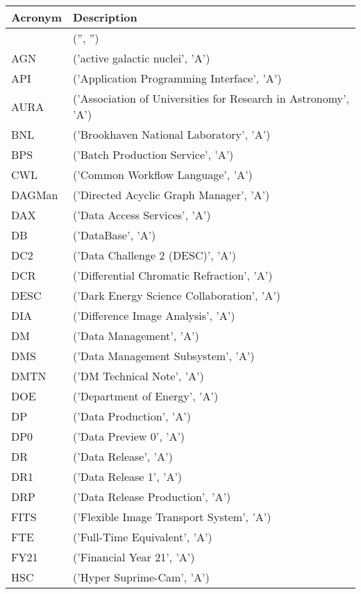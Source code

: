 \addtocounter{table}{-1}
\begin{longtable}{p{}p{}}\hline
\textbf{Acronym} & \textbf{Description}  \\\hline

 & ('', '') \\\hline
AGN & ('active galactic nuclei', 'A') \\\hline
API & ('Application Programming Interface', 'A') \\\hline
AURA & ('Association of Universities for Research in Astronomy', 'A') \\\hline
BNL & ('Brookhaven National Laboratory', 'A') \\\hline
BPS & ('Batch Production Service', 'A') \\\hline
CWL & ('Common Workflow Language', 'A') \\\hline
DAGMan & ('Directed Acyclic Graph Manager', 'A') \\\hline
DAX & ('Data Access Services', 'A') \\\hline
DB & ('DataBase', 'A') \\\hline
DC2 & ('Data Challenge 2 (DESC)', 'A') \\\hline
DCR & ('Differential Chromatic Refraction', 'A') \\\hline
DESC & ('Dark Energy Science Collaboration', 'A') \\\hline
DIA & ('Difference Image Analysis', 'A') \\\hline
DM & ('Data Management', 'A') \\\hline
DMS & ('Data Management Subsystem', 'A') \\\hline
DMTN & ('DM Technical Note', 'A') \\\hline
DOE & ('Department of Energy', 'A') \\\hline
DP & ('Data Production', 'A') \\\hline
DP0 & ('Data Preview 0', 'A') \\\hline
DR & ('Data Release', 'A') \\\hline
DR1 & ('Data Release 1', 'A') \\\hline
DRP & ('Data Release Production', 'A') \\\hline
FITS & ('Flexible Image Transport System', 'A') \\\hline
FTE & ('Full-Time Equivalent', 'A') \\\hline
FY21 & ('Financial Year 21', 'A') \\\hline
HSC & ('Hyper Suprime-Cam', 'A') \\\hline

\end{longtable}
